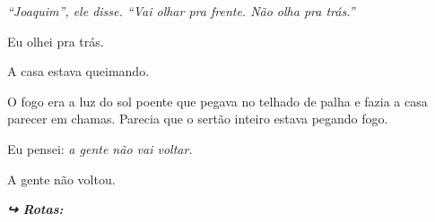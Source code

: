 \noindent \textit{\textquotedblleft{}Joaquim\textquotedblright{}\textit{, ele disse. }\textquotedblleft{}Vai olhar pra frente. Não olha pra trás.\textquotedblright{}}

\noindent Eu olhei pra trás.

\noindent A casa estava queimando.

\noindent O fogo era a luz do sol poente que pegava no telhado de palha e fazia a casa parecer em chamas. Parecia que o sertão inteiro estava pegando fogo.

\noindent Eu pensei: \textit{a gente não vai voltar.}

\noindent A gente não voltou.

\vspace{0.5em}
\noindent\textit{\textbf{↪ Rotas:}  \rotasep {}}